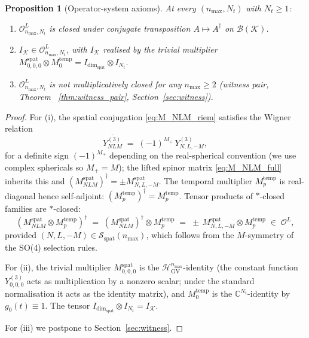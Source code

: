 \documentclass[11pt,a4paper]{article}
\theoremstyle{plain}
\newtheorem{proposition}[theorem]{Proposition}
\theoremstyle{definition}
\newcommand{\nmax}{n_{\max}}
\newcommand{\Nt}{N_t}
\newcommand{\Krein}{\mathcal{K}}
\newcommand{\Op}{\mathcal{O}}
\newcommand{\Bcal}{\mathcal{B}}
\newcommand{\C}{\mathbb{C}}
\newcommand{\HGV}{\mathcal{H}_{\mathrm{GV}}}
\newcommand{\spat}{\mathrm{spat}}
\newcommand{\temp}{\mathrm{temp}}
\begin{document}
\begin{proposition}[Operator-system axioms]\label{prop:axioms}
At every $(\nmax, \Nt)$ with $\Nt \ge 1$:
\begin{enumerate}\setlength{\itemsep}{2pt}
\item[(i)] $\Op_{\nmax, \Nt}^L$ is closed under conjugate
transposition $A \mapsto A^\dagger$ on $\Bcal(\Krein)$.
\item[(ii)] $I_{\Krein} \in \Op_{\nmax, \Nt}^L$, with $I_{\Krein}$
realised by the trivial multiplier $M^{\spat}_{0,0,0} \otimes
M_0^{\temp} = I_{\dim_\spat} \otimes I_{\Nt}$.
\item[(iii)] $\Op_{\nmax, \Nt}^L$ is \emph{not} multiplicatively
closed for any $\nmax \ge 2$ (witness pair, Theorem~%
\ref{thm:witness_pair}, Section~\ref{sec:witness}).
\end{enumerate}
\end{proposition}

\begin{proof}
For (i), the spatial conjugation
\eqref{eq:M_NLM_riem} satisfies the Wigner relation
\begin{equation}\label{eq:Y_conj}
   \overline{Y^{(3)}_{NLM}} \;=\; (-1)^{M_+}\, Y^{(3)}_{N, L, -M},
\end{equation}
for a definite sign $(-1)^{M_+}$ depending on the real-spherical
convention (we use complex sphericals so $M_+ = M$); the lifted
spinor matrix \eqref{eq:M_NLM_full} inherits this and
$(M^{\spat}_{NLM})^\dagger = \pm M^{\spat}_{N, L, -M}$. The temporal
multiplier $M_p^{\temp}$ is real-diagonal hence self-adjoint:
$(M_p^{\temp})^\dagger = M_p^{\temp}$. Tensor products of $*$-closed
families are $*$-closed:
\[
   (M^{\spat}_{NLM} \otimes M_p^{\temp})^\dagger
   \;=\; (M^{\spat}_{NLM})^\dagger \otimes M_p^{\temp}
   \;=\; \pm\, M^{\spat}_{N, L, -M} \otimes M_p^{\temp}
   \;\in\; \Op^L,
\]
provided $(N, L, -M) \in \mathcal{S}_{\spat}(\nmax)$, which follows
from the $M$-symmetry of the SO(4) selection rules.

For (ii), the trivial multiplier $M^{\spat}_{0,0,0}$ is the
$\HGV^{\nmax}$-identity (the constant function $Y^{(3)}_{0,0,0}$
acts as multiplication by a nonzero scalar; under the standard
normalisation it acts as the identity matrix), and
$M_0^{\temp}$ is the $\C^{\Nt}$-identity by
$g_0(t) \equiv 1$. The tensor $I_{\dim_\spat} \otimes I_{\Nt} =
I_{\Krein}$.

For (iii) we postpone to Section~\ref{sec:witness}.
\end{proof}
\end{document}
